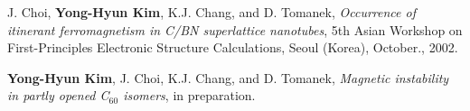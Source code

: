 \documentclass[doctor,english,final]{kaist-ucs}
\begin{document}
    \begin{activity}
        \item J. Choi, \textbf{Yong-Hyun Kim}, K.J. Chang, and D. Tomanek,
             \textit{Occurrence of itinerant ferromagnetism in C/BN superlattice
             nanotubes}, 5th Asian Workshop on First-Principles Electronic
             Structure Calculations, Seoul (Korea), October., 2002.
    \end{activity}

    \begin{publication}
        \item \textbf{Yong-Hyun Kim}, J. Choi, K.J. Chang, and D. Tomanek,
             \textit{Magnetic instability in partly opened C$_{60}$ isomers},
             in preparation.
    \end{publication}

\end{document}
